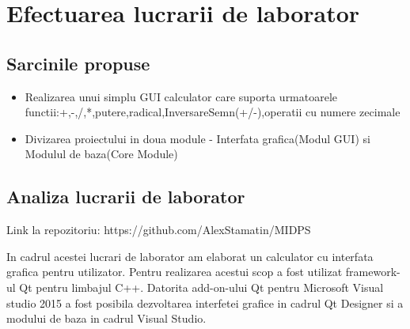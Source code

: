 \section{Efectuarea lucrarii de laborator}

\subsection{Sarcinile propuse}
\begin{itemize}
	\item Realizarea unui simplu GUI calculator care suporta urmatoarele functii:+,-,/,*,putere,radical,InversareSemn(+/-),operatii cu numere zecimale
	\item Divizarea proiectului in doua module - Interfata grafica(Modul GUI) si Modulul de baza(Core Module)
\end{itemize}


\subsection{Analiza lucrarii de laborator}

Link la repozitoriu: https://github.com/AlexStamatin/MIDPS

	In cadrul acestei lucrari de laborator am elaborat un calculator cu interfata grafica pentru utilizator. Pentru realizarea acestui scop a fost utilizat framework-ul Qt pentru limbajul C++. Datorita add-on-ului Qt pentru Microsoft Visual studio 2015 a fost posibila dezvoltarea interfetei grafice in cadrul Qt Designer si a modului de baza in cadrul Visual Studio.

